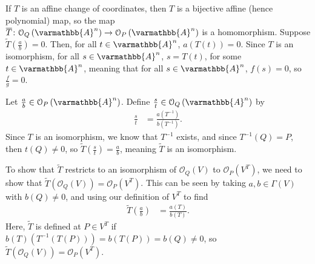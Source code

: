 \documentclass[10pt]{mypackage}
\renewcommand*{\mathbb}[1]{\varmathbb{#1}}
\newcommand{\A}{\mathbb{A}}
\begin{document}
\begin{solution}
  If $T$ is an affine change of coordinates, then $T$ is a bijective affine (hence polynomial) map, so the map $ \overline{T}\colon \mathcal{O}_Q\left( \A^n \right)\rightarrow \mathcal{O}_P\left( \A^n \right)$ is a homomorphism. Suppose $\widetilde{T}\left( \frac{a}{b} \right) = 0$. Then, for all $t\in \A^n$, $a\left( T\left( t \right) \right) = 0$. Since $T$ is an isomorphism, for all $s\in \A^n$, $s = T(t)$, for some $t\in \A^n$, meaning that for all $s\in \A^n$, $f\left( s \right) = 0$, so $\frac{f}{g} = 0$.\newline

  Let $\frac{a}{b}\in \mathcal{O}_P\left( \A^n \right)$. Define $\frac{s}{t}\in \mathcal{O}_Q\left(\A^n\right)$ by
  \begin{align*}
    \frac{s}{t} &= \frac{a\left( T^{-1} \right)}{b\left( T^{-1} \right)}.
  \end{align*}
  Since $T$ is an isomorphism, we know that $T^{-1}$ exists, and since $T^{-1}\left( Q \right) = P$, then $t\left( Q \right)\neq 0$, so $\widetilde{T}\left( \frac{s}{t} \right) = \frac{a}{b}$, meaning $\widetilde{T}$ is an isomorphism.\newline

  To show that $\widetilde{T}$ restricts to an isomorphism of $\mathcal{O}_Q(V)$ to $\mathcal{O}_P\left( V^{T} \right)$, we need to show that $\widetilde{T}\left( \mathcal{O}_Q\left( V \right) \right) = \mathcal{O}_P\left( V^{T} \right)$. This can be seen by taking $a,b\in \Gamma\left( V \right)$ with $b\left( Q \right)\neq 0$, and using our definition of $V^T$ to find
  \begin{align*}
    \widetilde{T}\left( \frac{a}{b} \right) &= \frac{a(T)}{b(T)}.
  \end{align*}
  Here, $\widetilde{T}$ is defined at $ P\in V^{T}$ if $b\left( T \right)\left( T^{-1}\left( T(P) \right) \right) = b\left( T(P) \right) = b(Q) \neq 0$, so $\widetilde{T}\left( \mathcal{O}_Q\left( V \right) \right) = \mathcal{O}_P\left( V^{T} \right)$.
\end{solution}
\end{document}
